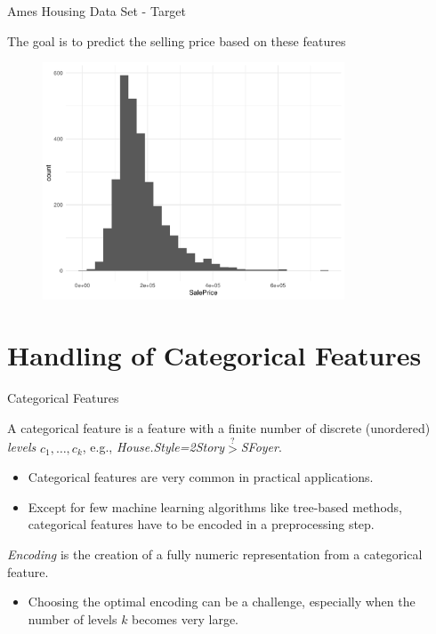 \documentclass[11pt,compress,t,notes=noshow, xcolor=table]{beamer}
\begin{document}
\begin{frame}{Ames Housing Data Set - Target}

The goal is to predict the selling price based on these features

\begin{figure}[h]
\centering
\includegraphics[width=0.8\textwidth]{figure/ames_target_distrib.pdf}
\end{figure}


\end{frame}

\section{Handling of Categorical Features}

\begin{vbframe}{Categorical Features}

A categorical feature is a feature with a finite number of discrete (unordered) \textit{levels} $c_1, \dots, c_k$, e.g., \textit{House.Style=2Story}$\stackrel{?}{>}$\textit{SFoyer}.

\begin{itemize}
\item Categorical features are very common in practical applications.

\item Except for few machine learning algorithms like tree-based methods, categorical features have to be encoded in a preprocessing step.
\end{itemize}

\textit{Encoding} is the creation of a fully numeric representation from a categorical feature.

\begin{itemize}
\item Choosing the optimal encoding can be a challenge, especially when the number of levels $k$ becomes very large.
\end{itemize}

\end{vbframe}
\end{document}
